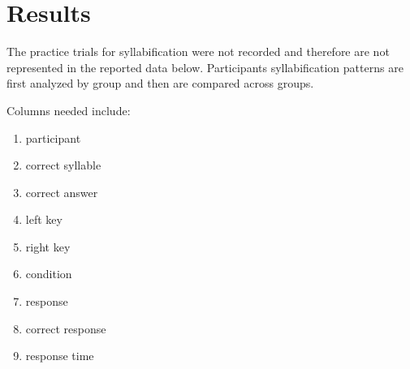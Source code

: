 
\section{Results}

The practice trials for syllabification were not recorded and therefore are not represented in the reported data below. Participants syllabification patterns are first analyzed by group and then are compared across groups. 




Columns needed include:
\begin{enumerate}
\item{participant}
\item{correct syllable}
\item{correct answer}
\item{left key}
\item{right key}
\item{condition}
\item{response}
\item{correct response}
\item{response time}
\end{enumerate}



